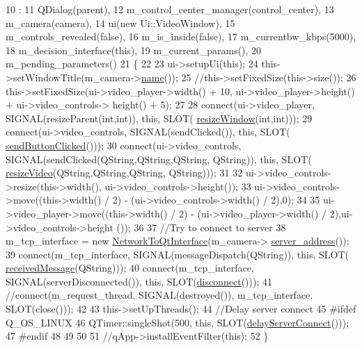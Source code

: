 \begin{DoxyCode}
10                                                                                                :
11     QDialog(parent),
12     m\_control\_center\_manager(control\_center),
13     m\_camera(camera),
14     ui(\textcolor{keyword}{new} Ui::VideoWindow),
15     m\_controls\_revealed(\textcolor{keyword}{false}),
16     m\_is\_inside(\textcolor{keyword}{false}),
17     m\_currentbw\_kbps(5000),
18     m\_decision\_interface(\textcolor{keyword}{this}),
19     m\_current\_params(),
20     m\_pending\_parameters()
21 \{   
22 
23     ui->setupUi(\textcolor{keyword}{this});
24     this->setWindowTitle(m\_camera->\hyperlink{classCamera_a5763757e8d6adb6437dde2502072a3b1}{name}());
25     \textcolor{comment}{//this->setFixedSize(this->size());}
26     this->setFixedSize(ui->video\_player->width() + 10, ui->video\_player->height() + ui->video\_controls->
      height() + 5);
27 
28     connect(ui->video\_player, SIGNAL(resizeParent(\textcolor{keywordtype}{int},\textcolor{keywordtype}{int})), \textcolor{keyword}{this}, SLOT(
      \hyperlink{classVideoWindow_a5035f10be178cfc311d637c19938a344}{resizeWindow}(\textcolor{keywordtype}{int},\textcolor{keywordtype}{int})));
29     connect(ui->video\_controls, SIGNAL(sendClicked()), \textcolor{keyword}{this}, SLOT(
      \hyperlink{classVideoWindow_a655194e6449c76e200135c88f8fafd7d}{sendButtonClicked}()));
30     connect(ui->video\_controls, SIGNAL(sendClicked(QString,QString,QString, QString)), \textcolor{keyword}{this}, SLOT(
      \hyperlink{classVideoWindow_ac07f4db8a805849174cb129134708fd4}{resizeVideo}(QString,QString,QString, QString)));
31 
32     ui->video\_controls->resize(this->width(), ui->video\_controls->height());
33     ui->video\_controls->move((this->width() / 2) - (ui->video\_controls->width() / 2),0);
34 
35     ui->video\_player->move((this->width() / 2) - (ui->video\_player->width() / 2),ui->video\_controls->height
      ());
36 
37     \textcolor{comment}{//Try to connect to server}
38     m\_tcp\_interface = \textcolor{keyword}{new} \hyperlink{classNetworkToQtInterface}{NetworkToQtInterface}(m\_camera->
      \hyperlink{classCamera_aa93654bec9b65adfb95e192ac9c71e80}{server\_address}());
39     connect(m\_tcp\_interface, SIGNAL(messageDispatch(QString)), \textcolor{keyword}{this}, SLOT(
      \hyperlink{classVideoWindow_ab25ad37e9dfdb92f46212d4309d4232f}{receivedMessage}(QString)));
40     connect(m\_tcp\_interface, SIGNAL(serverDisconnected()), \textcolor{keyword}{this}, SLOT(\hyperlink{classVideoWindow_a68b4f26c999360c30b12cc70347393c7}{disconnect}()));
41     \textcolor{comment}{//connect(m\_request\_thread, SIGNAL(destroyed()), m\_tcp\_interface, SLOT(close()));}
42 
43     this->setUpThreads();
44     \textcolor{comment}{//Delay server connect}
45 \textcolor{preprocessor}{#ifdef Q\_OS\_LINUX}
46 \textcolor{preprocessor}{}    QTimer::singleShot(500, \textcolor{keyword}{this}, SLOT(\hyperlink{classVideoWindow_a55220de4b6b3b8e2575201c933932059}{delayServerConnect}()));
47 \textcolor{preprocessor}{#endif}
48 \textcolor{preprocessor}{}
49 
50 
51     \textcolor{comment}{//qApp->installEventFilter(this);}
52 \}
\end{DoxyCode}
